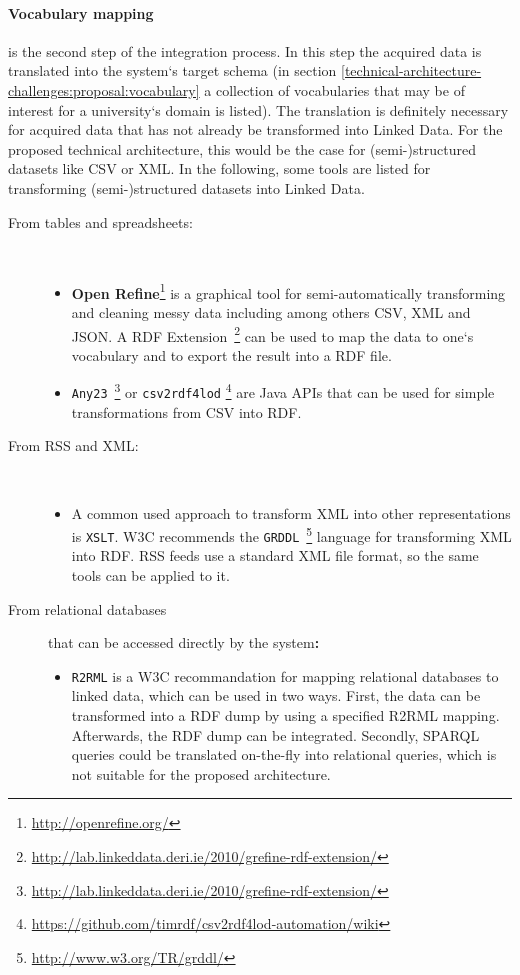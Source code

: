 \documentclass{article}
\begin{document}
\paragraph{Vocabulary mapping} is the second step of the integration process. In this step the acquired data is translated into the system`s target schema (in section \ref{technical-architecture-challenges:proposal:vocabulary} a collection of vocabularies that may be of interest for a university`s domain is listed). The translation is definitely necessary for acquired data that has not already be transformed into Linked Data. For the proposed technical architecture, this would be the case for (semi-)structured datasets like CSV or XML. In the following, some tools are listed for transforming (semi-)structured datasets into Linked Data.

\begin{description}
 	\item[\small From tables and spreadsheets:] $ $
 	\begin{itemize}
 		\item \textbf{Open Refine}\footnote{\url{http://openrefine.org/}} is a graphical tool for semi-automatically transforming and cleaning messy data including among others CSV, XML and JSON. A RDF Extension~\footnote{\url{http://lab.linkeddata.deri.ie/2010/grefine-rdf-extension/}} can be used to map the data to one`s vocabulary and to export the result into a RDF file.
 		\item \texttt{Any23}~\footnote{\url{http://lab.linkeddata.deri.ie/2010/grefine-rdf-extension/}} or  \texttt{csv2rdf4lod} \footnote{\url{https://github.com/timrdf/csv2rdf4lod-automation/wiki}} are Java APIs that can be used for simple transformations from CSV into RDF.
	\end{itemize}
	\item[\small From RSS and XML:] $ $
	\begin{itemize}
		\item A common used approach to transform XML into other representations is \texttt{XSLT}. W3C recommends the \texttt{GRDDL}~\footnote{\url{http://www.w3.org/TR/grddl/}} language for transforming XML into RDF. RSS feeds use a standard XML file format, so the same tools can be applied to it.
	\end{itemize}
	\item[\small From relational databases]  that can be accessed directly by the system\textbf{:}
	\begin{itemize}
		\item \texttt{R2RML} is a W3C recommandation for mapping relational databases to linked data, which can be used in two ways. First, the data can be transformed into a RDF dump by using a specified R2RML mapping. Afterwards, the RDF dump can be integrated. Secondly, SPARQL queries could be translated on-the-fly into relational queries, which is not suitable for the proposed architecture.

\end{itemize}
\end{description}
\end{document}
